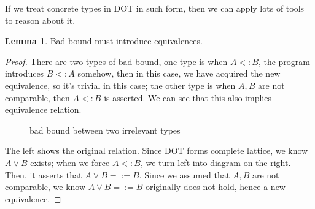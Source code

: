 \documentclass{article}
\theoremstyle{definition}
\newtheorem{lemma}{Lemma}
\begin{document}
If we treat concrete types in DOT in such form, then we can apply lots of tools to
reason about it.

\begin{lemma}
Bad bound must introduce equivalences.
\end{lemma}
\begin{proof}
  There are two types of bad bound, one type is when $A <: B$, the program introduces
  $B <: A$ somehow, then in this case, we have acquired the new equivalence, so it's
  trivial in this case; the other type is when $A, B$ are not comparable, then
  $A <: B$ is asserted. We can see that this also implies equivalence relation.

  \begin{figure}[H]
    \centering
    \begin{multicols}{2}
      \begin{figure}[H]
        \centering
      \end{figure}

      \begin{figure}[H]
        \centering
      \end{figure}    
    \end{multicols}
    \caption{bad bound between two irrelevant types}
  \end{figure}
  
  The left shows the original relation. Since DOT forms complete lattice, we know
  $A \vee B$ exists; when we force $A <: B$, we turn left into diagram on the
  right. Then, it asserts that $A \vee B =:= B$. Since we assumed that $A, B$ are not
  comparable, we know $A \vee B =:= B$ originally does not hold, hence a new
  equivalence.
\end{proof}
\end{document}
